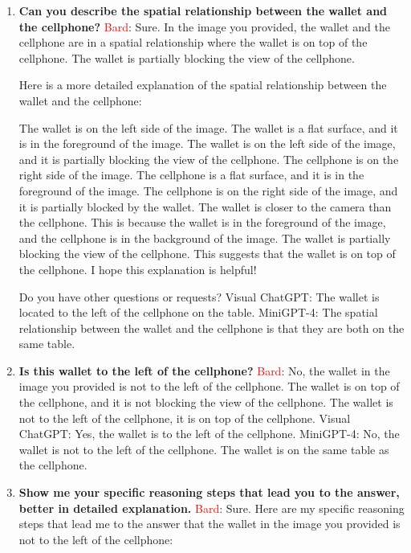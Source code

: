 \begin{enumerate}
    \item \textbf{Can you describe the spatial relationship between the wallet and the cellphone?}
    \subitem \textcolor{Red}{Bard}: 
    Sure. In the image you provided, the wallet and the cellphone are in a spatial relationship where the wallet is on top of the cellphone. The wallet is partially blocking the view of the cellphone.

    Here is a more detailed explanation of the spatial relationship between the wallet and the cellphone:

    The wallet is on the left side of the image. The wallet is a flat surface, and it is in the foreground of the image. The wallet is on the left side of the image, and it is partially blocking the view of the cellphone.
    The cellphone is on the right side of the image. The cellphone is a flat surface, and it is in the foreground of the image. The cellphone is on the right side of the image, and it is partially blocked by the wallet.
    The wallet is closer to the camera than the cellphone. This is because the wallet is in the foreground of the image, and the cellphone is in the background of the image.
    The wallet is partially blocking the view of the cellphone. This suggests that the wallet is on top of the cellphone.
    I hope this explanation is helpful!

    Do you have other questions or requests?
    \subitem Visual ChatGPT: The wallet is located to the left of the cellphone on the table.
    \subitem MiniGPT-4: The spatial relationship between the wallet and the cellphone is that they are both on the same table.
    \item \textbf{Is this wallet to the left of the cellphone?}
    \subitem \textcolor{Red}{Bard}: 
    No, the wallet in the image you provided is not to the left of the cellphone. The wallet is on top of the cellphone, and it is not blocking the view of the cellphone. The wallet is not to the left of the cellphone, it is on top of the cellphone.
    \subitem Visual ChatGPT: Yes, the wallet is to the left of the cellphone.
    \subitem MiniGPT-4: No, the wallet is not to the left of the cellphone. The wallet is on the same table as the cellphone.
    \item \textbf{Show me your specific reasoning steps that lead you to the answer, better in detailed explanation.}
    \subitem \textcolor{Red}{Bard}: 
    Sure. Here are my specific reasoning steps that lead me to the answer that the wallet in the image you provided is not to the left of the cellphone:
    

\end{enumerate}
